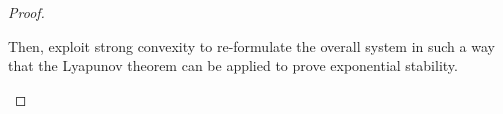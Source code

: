 \begin{subappendices}
\begin{theorem}
\begin{proof}
\begin{description}
                Then, exploit strong convexity to re-formulate the overall system in such a way that the Lyapunov theorem can be applied to prove exponential stability.



\end{description}
\end{proof}
\end{theorem}
\end{subappendices}
